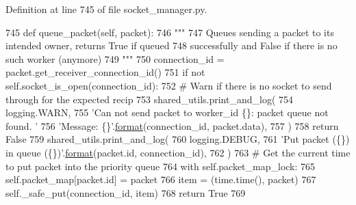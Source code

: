 Definition at line 745 of file socket\+\_\+manager.\+py.


\begin{DoxyCode}
745     \textcolor{keyword}{def }queue\_packet(self, packet):
746         \textcolor{stringliteral}{"""}
747 \textcolor{stringliteral}{        Queues sending a packet to its intended owner, returns True if queued}
748 \textcolor{stringliteral}{        successfully and False if there is no such worker (anymore)}
749 \textcolor{stringliteral}{        """}
750         connection\_id = packet.get\_receiver\_connection\_id()
751         \textcolor{keywordflow}{if} \textcolor{keywordflow}{not} self.socket\_is\_open(connection\_id):
752             \textcolor{comment}{# Warn if there is no socket to send through for the expected recip}
753             shared\_utils.print\_and\_log(
754                 logging.WARN,
755                 \textcolor{stringliteral}{'Can not send packet to worker\_id \{\}: packet queue not found. '}
756                 \textcolor{stringliteral}{'Message: \{\}'}.\hyperlink{namespaceparlai_1_1chat__service_1_1services_1_1messenger_1_1shared__utils_a32e2e2022b824fbaf80c747160b52a76}{format}(connection\_id, packet.data),
757             )
758             \textcolor{keywordflow}{return} \textcolor{keyword}{False}
759         shared\_utils.print\_and\_log(
760             logging.DEBUG,
761             \textcolor{stringliteral}{'Put packet (\{\}) in queue (\{\})'}.\hyperlink{namespaceparlai_1_1chat__service_1_1services_1_1messenger_1_1shared__utils_a32e2e2022b824fbaf80c747160b52a76}{format}(packet.id, connection\_id),
762         )
763         \textcolor{comment}{# Get the current time to put packet into the priority queue}
764         with self.packet\_map\_lock:
765             self.packet\_map[packet.id] = packet
766         item = (time.time(), packet)
767         self.\_safe\_put(connection\_id, item)
768         \textcolor{keywordflow}{return} \textcolor{keyword}{True}
769 
\end{DoxyCode}
\mbox{\label{classparlai_1_1mturk_1_1core_1_1legacy__2018_1_1socket__manager_1_1SocketManager_a994294d92872fd98ec0fabd9d2a56793}} 
